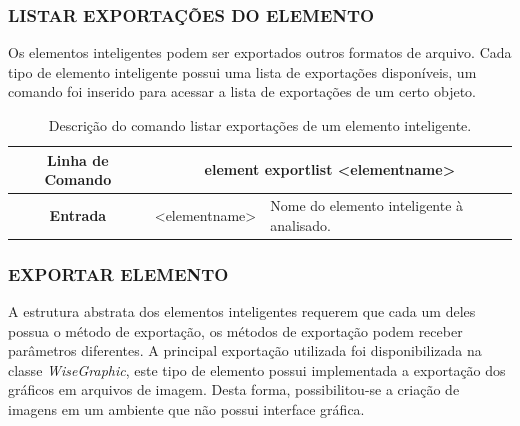\documentclass[a4paper,12pt]{monografia}
\theoremstyle{plain}
\theoremstyle{definition}
\theoremstyle{remark}
\begin{document}
\subsubsection{LISTAR EXPORTAÇÕES DO ELEMENTO}\label{sec:export_list_element}

Os elementos inteligentes podem ser exportados outros formatos de arquivo. Cada tipo de elemento inteligente possui uma lista de exportações disponíveis, um comando foi inserido para acessar a lista de exportações de um certo objeto.

\begin{center}
\begin{table}[!htbp]
	\begin{tabular}{|c|c|m{}|}
		\hline
		\textbf{Linha de Comando} & \multicolumn{2}{c|}{element export\underline{\space\space}list <element\underline{\space\space}name>}  \\
		\hline
		\textbf{Entrada} & <element\underline{\space\space}name> & Nome do elemento inteligente à analisado. \\
		\hline
	\end{tabular}
	\caption{Descrição do comando listar exportações de um elemento inteligente.}
	\label{tab:export_list_element}
\end{table}
\end{center}

\subsubsection{EXPORTAR ELEMENTO}\label{sec:export_element}

A estrutura abstrata dos elementos inteligentes requerem que cada um deles possua o método de exportação, os métodos de exportação podem receber parâmetros diferentes. A principal exportação utilizada foi disponibilizada na classe \textit{WiseGraphic}, este tipo de elemento possui implementada a exportação dos gráficos em arquivos de imagem. Desta forma, possibilitou-se a criação de imagens em um ambiente que não possui interface gráfica.
\end{document}
